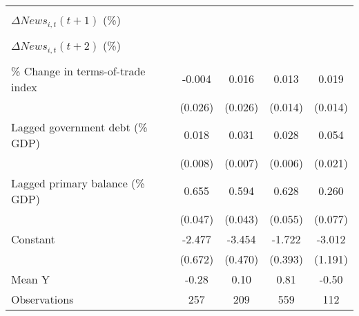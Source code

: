 {\begin{tabular}{l*{4}{c}}
                    &                     &                     &                     &                     \\
\addlinespace
$ \Delta News_{i,t}(t+1)$ (\%)&                     &                     &                     &                     \\
                    &                     &                     &                     &                     \\
\addlinespace
$ \Delta News_{i,t}(t+2)$ (\%)&                     &                     &                     &                     \\
                    &                     &                     &                     &                     \\
\addlinespace
\% Change in terms-of-trade index&      -0.004         &       0.016         &       0.013         &       0.019         \\
                    &     (0.026)         &     (0.026)         &     (0.014)         &     (0.014)         \\
\addlinespace
Lagged government debt (\% GDP)&       0.018\sym{**} &       0.031\sym{***}&       0.028\sym{***}&       0.054\sym{**} \\
                    &     (0.008)         &     (0.007)         &     (0.006)         &     (0.021)         \\
\addlinespace
Lagged primary balance (\% GDP)&       0.655\sym{***}&       0.594\sym{***}&       0.628\sym{***}&       0.260\sym{***}\\
                    &     (0.047)         &     (0.043)         &     (0.055)         &     (0.077)         \\
\addlinespace
Constant            &      -2.477\sym{***}&      -3.454\sym{***}&      -1.722\sym{***}&      -3.012\sym{**} \\
                    &     (0.672)         &     (0.470)         &     (0.393)         &     (1.191)         \\
\midrule
Mean Y              &       -0.28         &        0.10         &        0.81         &       -0.50         \\
Observations        &         257         &         209         &         559         &         112         \\
\bottomrule
\end{tabular}
}
